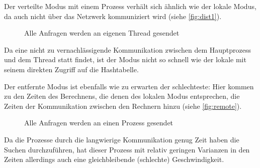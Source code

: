 \documentclass{scrreprt}
\begin{document}
Der verteilte Modus mit einem Prozess verhält sich ähnlich wie der lokale Modus, da auch nicht über das Netzwerk kommuniziert wird (siehe \autoref{fig:dist1}). %
\begin{figure}[!ht]
\centering
{}
\caption{Alle Anfragen werden an eigenen Thread gesendet}
\label{fig:dist1}
\end{figure}%
Da eine nicht zu vernachlässigende Kommunikation zwischen dem Hauptprozess und dem Thread statt findet, ist der Modus nicht so schnell wie der lokale mit seinem direkten Zugriff auf die Hashtabelle. \bigskip

Der entfernte Modus ist ebenfalls wie zu erwarten der schlechteste: Hier kommen zu den Zeiten des Berechnens, die denen des lokalen Modus entsprechen, die Zeiten der Kommunikation zwischen den Rechnern hinzu (siehe \autoref{fig:remote}). %
\begin{figure}[!ht]
\centering
{}
\caption{Alle Anfragen werden an einen Prozess gesendet}
\label{fig:remote}
\end{figure}%
Da die Prozesse durch die langwierige Kommunikation genug Zeit haben die Suchen durchzuführen, hat dieser Prozess mit relativ geringen Varianzen in den Zeiten allerdings auch eine gleichbleibende (schlechte) Geschwindigkeit. \bigskip
\end{document}
